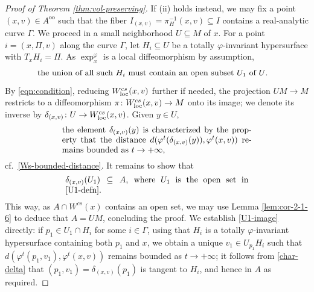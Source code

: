 \documentclass[pdftex]{sigma}
\numberwithin{equation}{section}
\theoremstyle{definition}
\begin{document}
\begin{proof}[Proof of Theorem \ref{thm:vol-preserving}]
If (ii) holds instead, we may fix a point $(x,v) \in A^{\mathrm{o} \mathrm{o}}$ such that the fiber $I_{(x,v)} = \pi_H^{-1}(x,v) \subseteq I$
contains a real-analytic curve $\Gamma$. We proceed in a small neighborhood $U \subseteq M$ of $x$. For a point $i = (x, \Pi, v)$ along the curve $\Gamma$, let $H_i \subseteq U$ be a totally $\varphi$-invariant hypersurface with $T_xH_i = \Pi$. As $\exp_x^\varphi$ is a local diffeomorphism by assumption, \begin{equation}\label{U1-defn}\parbox{.82\textwidth}{the union of all such $H_i$ must contain an open subset $U_1$ of $U$.}\end{equation} By \eqref{eqn:condition}, reducing $W^{cs}_{\rm loc}(x,v)$ further if needed, the projection $UM\to M$ restricts to a diffeomorphism $\pi\colon W^{cs}_{\rm loc}(x,v)\to M$ onto its image; we denote its inverse by $\delta_{(x,v)}\colon U \to W^{cs}_{\rm loc}(x,v)$. Given $y\in U$, \begin{equation}\label{char-delta}\parbox{.65\textwidth}{the element $\delta_{(x,v)}(y)$ is characterized by the property that the distance $d(\varphi^t(\delta_{(x,v)}(y)),\varphi^t(x,v))$ remains bounded as $t\to +\infty$,}\end{equation} cf.\ \eqref{Ws-bounded-distance}. It remains to show that \begin{equation}\label{U1-image}
 \parbox{.63\textwidth}{$\delta_{(x,v)}(U_1) \subseteq A$, where $U_1$ is the open set in \eqref{U1-defn}.}
 \end{equation}
 This way, as $A \cap W^{cs}(x)$ contains an open set, we may use Lemma \ref{lem:cor-2-1-6} to deduce that $A = UM$, concluding the proof. We establish \eqref{U1-image} directly: if $p_1 \in U_1 \cap H_i$ for some $i\in \Gamma$, using that $H_i$ is a totally $\varphi$-invariant hypersurface containing both $p_1$ and $x$, we obtain a unique $v_1\in U_{p_1}H_i$ such that $d(\varphi^t(p_1,v_1), \varphi^t(x,v))$ remains bounded as $t\to +\infty$; it follows from \eqref{char-delta} that $(p_1,v_1) = \delta_{(x,v)}(p_1)$ is tangent to $H_i$, and hence in $A$ as required.
 \end{proof}
\end{document}
